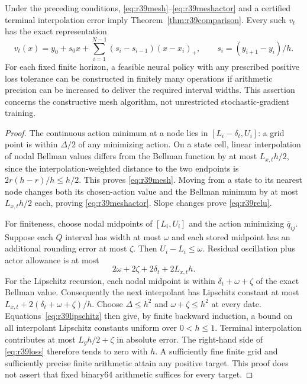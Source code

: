 \begin{proposition}\label{prop:r39construction}
Under the preceding conditions, \eqref{eq:r39mesh}--\eqref{eq:r39meshactor}
and a certified terminal interpolation error imply
Theorem~\ref{thm:r39comparison}. Every such $v_t$ has the exact representation
\begin{equation}\label{eq:r39relu}
 v_t(x)=y_0+s_0x+\sum_{i=1}^{N-1}(s_i-s_{i-1})(x-x_i)_+,
 \qquad s_i=(y_{i+1}-y_i)/h.
\end{equation}
For each fixed finite horizon, a feasible neural policy with any prescribed
positive loss tolerance can be constructed in finitely many operations if
arithmetic precision can be increased to deliver the required interval widths.
This assertion concerns the constructive mesh algorithm, not unrestricted
stochastic-gradient training.
\end{proposition}

\begin{proof}
The continuous action minimum at a node lies in $[L_i-\delta_t,U_i]$:
a grid point is within $\Delta/2$ of any minimizing action. On a state cell,
linear interpolation of nodal Bellman values differs from the Bellman function
by at most $L_{x,t}h/2$, since the interpolation-weighted distance to the two
endpoints is $2r(h-r)/h\leq h/2$. This proves \eqref{eq:r39mesh}.
Moving from a state to its nearest node changes both its chosen-action value
and the Bellman minimum by at most $L_{x,t}h/2$ each, proving
\eqref{eq:r39meshactor}. Slope changes prove \eqref{eq:r39relu}.

For finiteness, choose nodal midpoints of $[L_i,U_i]$ and the action minimizing
$\overline q_{ij}$. Suppose each $Q$ interval has width at most $\omega$ and
each stored midpoint has an additional rounding error at most $\zeta$.
Then $U_i-L_i\leq\omega$. Residual oscillation plus actor allowance is at most
\[
 2\omega+2\zeta+2\delta_t+2L_{x,t}h.
\]
For the Lipschitz recursion, each nodal midpoint is within
$\delta_t+\omega+\zeta$ of the exact Bellman value. Consequently the next
interpolant has Lipschitz constant at most
$L_{x,t}+2(\delta_t+\omega+\zeta)/h$.
Choose $\Delta\leq h^2$ and $\omega+\zeta\leq h^2$ at every date.
Equations~\eqref{eq:r39lipschitz} then give, by finite backward induction,
a bound on all interpolant Lipschitz constants uniform over $0<h\leq1$.
Terminal interpolation contributes at most $L_g h/2+\zeta$ in absolute error.
The right-hand side of \eqref{eq:r39loss} therefore tends to zero with $h$.
A sufficiently fine finite grid and sufficiently precise finite arithmetic
attain any positive target. This proof does not assert that fixed binary64
arithmetic suffices for every target.
\end{proof}


